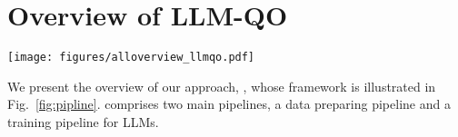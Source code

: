 
\section{Overview of LLM-QO}
\label{sec:overview}

\begin{figure*}
  \centering
  \texttt{[image: figures/alloverview\_llmqo.pdf]}
  \caption{The overview of \LLMQO, which consists of: (a) \QueryInstruct and the data preparing pipeline,  (b)The training pipeline for LLMs, and (c) The inference pipeline.
  }
  \label{fig:pipline}
\end{figure*}

We present the overview of our approach, \LLMQO, whose framework is illustrated in Fig.~\ref{fig:pipline}.
\LLMQO comprises two main pipelines, a data preparing pipeline and a training pipeline for LLMs. 

